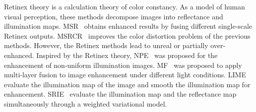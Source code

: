\documentclass[journal]{IEEEtran}
\begin{document}
Retinex theory is a calculation theory of color constancy. As a model of human visual perception, these methods decompose images into reflectance and illumination maps. MSR~\cite{jobson1997multiscale} obtains enhanced results by fusing different single-scale Retinex outputs. MSRCR~\cite{jobson1997multiscale} improves the color distortion problem of the previous methods. However, the Retinex methods lead to unreal or partially over-enhanced. Inspired by the Retinex theory, NPE~\cite{wang2013naturalness} was proposed for the enhancement of non-uniform illumination images. MF~\cite{fu2016fusion} was proposed to apply multi-layer fusion to image enhancement under different light conditions. LIME~\cite{guo2016lime} evaluate the illumination map of the image and smooth the illumination map for enhancement. SRIE~\cite{fu2016weighted} evaluate the illumination map and the reflectance map simultaneously through a weighted variational model.
\end{document}
